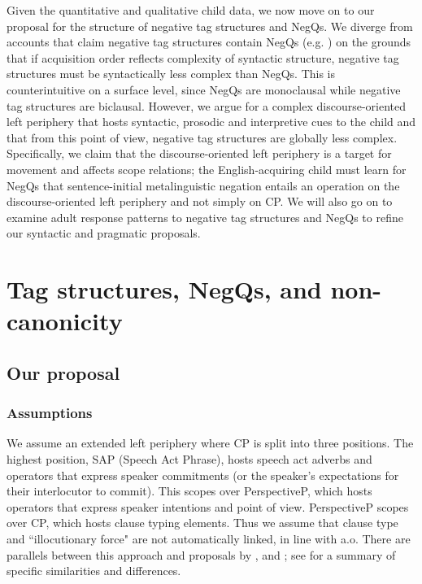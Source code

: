 \documentclass[output=paper,colorlinks,citecolor=brown]{langscibook}
\begin{document}
Given the quantitative and qualitative child data, we now move on to our proposal for the structure of negative tag structures and NegQs. We diverge from accounts that claim negative tag structures contain NegQs (e.g. \citealt{sailor2012}) on the grounds that if acquisition order reflects complexity of syntactic structure, negative tag structures must be syntactically less complex than NegQs. This is counterintuitive on a surface level, since NegQs are monoclausal while negative tag structures are biclausal. However, we argue for a complex discourse-oriented left periphery that hosts syntactic, prosodic and interpretive cues to the child and that from this point of view, negative tag structures are globally less complex. Specifically, we claim that the discourse-oriented left periphery is a target for movement and affects scope relations; the English-acquiring child must learn for NegQs that sentence-initial metalinguistic negation entails an operation on the discourse-oriented left periphery and not simply on CP. We will also go on to examine adult response patterns to negative tag structures and NegQs to refine our syntactic and pragmatic proposals.

\section{Tag structures, NegQs, and non-canonicity}\label{sect:ourwork}
\subsection{Our proposal}\label{sect:proposal}
\subsubsection{Assumptions}

We assume an extended left periphery where CP is split into three positions. The highest position, SAP (Speech Act Phrase), hosts speech act adverbs and operators that express speaker commitments (or the speaker's expectations for their interlocutor to commit). This scopes over PerspectiveP, which hosts operators that express speaker intentions and point of view. PerspectiveP scopes over CP, which hosts clause typing elements. Thus we assume that clause type and ``illocutionary force" are not automatically linked, in line with \citet{conigzeg2012} a.o. There are parallels between this approach and proposals by \citet{hill2013}, \citet{krifka2021} and \citet{wiltschko2021}; see \citet{woods2021please} for a summary of specific similarities and differences.
\end{document}
